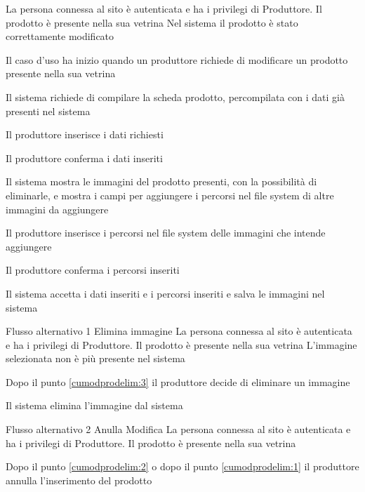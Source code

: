 {}
{La persona connessa al sito è autenticata e ha i privilegi di Produttore. Il prodotto è presente nella sua vetrina}%
{Nel sistema il prodotto è stato correttamente modificato}
{\begin{enumCU}
		\item Il caso d'uso ha inizio quando un produttore richiede di modificare un prodotto presente nella sua vetrina
		\item Il sistema richiede di compilare la scheda prodotto, percompilata con i dati già presenti nel sistema
		\item Il produttore inserisce i dati richiesti \label{cumodprodelim:1}
		\item Il produttore conferma i dati inseriti
		\item Il sistema mostra le immagini del prodotto presenti, con la possibilità di eliminarle, e mostra i campi per aggiungere i percorsi nel file system di altre immagini da aggiungere \label{cumodprodelim:3}
		\item Il produttore inserisce i percorsi nel file system delle immagini che intende aggiungere
		\item Il produttore conferma i percorsi inseriti \label{cumodprodelim:2}
		\item Il sistema accetta i dati inseriti e i percorsi inseriti e salva le immagini nel sistema
	\end{enumCU}} %
%
{Flusso alternativo 1}%
{Elimina immagine}%
{La persona connessa al sito è autenticata e ha i privilegi di Produttore. Il prodotto è presente nella sua vetrina}
{L'immagine selezionata non è più presente nel sistema}%
{\begin{enumCU}
		\item Dopo il punto \ref{cumodprodelim:3} il produttore decide di eliminare un immagine
		\item Il sistema elimina l'immagine dal sistema
	\end{enumCU}}%
%
{Flusso alternativo 2}%
{Anulla Modifica}%
{La persona connessa al sito è autenticata e ha i privilegi di Produttore. Il prodotto è presente nella sua vetrina}%
{\postNulle}%
{\begin{enumCU}
		\item Dopo il punto \ref{cumodprodelim:2} o dopo il punto \ref{cumodprodelim:1} il produttore annulla l'inserimento del prodotto
	\end{enumCU}}%

